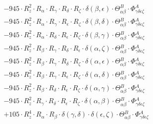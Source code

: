\documentclass{article}
\begin{document}
\begin{equation}
\begin{array}{c}
 \\[0.2em] 		 - 945 \cdot R_{z}^{2} \cdot R_{\alpha{}} \cdot R_{\gamma{}} \cdot R_{\delta{}} \cdot R_{\zeta{}} \cdot \delta{}\left(\beta{}, \epsilon{}\right) \cdot \Theta{}^{B}_{\alpha{}\beta{}} \cdot \Phi{}^{A}_{\gamma{}\delta{}\epsilon{}\zeta{}} 
 \\[0.2em] 		 - 945 \cdot R_{z}^{2} \cdot R_{\alpha{}} \cdot R_{\gamma{}} \cdot R_{\epsilon{}} \cdot R_{\zeta{}} \cdot \delta{}\left(\beta{}, \delta{}\right) \cdot \Theta{}^{B}_{\alpha{}\beta{}} \cdot \Phi{}^{A}_{\gamma{}\delta{}\epsilon{}\zeta{}} 
 \\[0.2em] 		 - 945 \cdot R_{z}^{2} \cdot R_{\alpha{}} \cdot R_{\delta{}} \cdot R_{\epsilon{}} \cdot R_{\zeta{}} \cdot \delta{}\left(\beta{}, \gamma{}\right) \cdot \Theta{}^{B}_{\alpha{}\beta{}} \cdot \Phi{}^{A}_{\gamma{}\delta{}\epsilon{}\zeta{}} 
 \\[0.2em] 		 - 945 \cdot R_{z}^{2} \cdot R_{\beta{}} \cdot R_{\gamma{}} \cdot R_{\delta{}} \cdot R_{\epsilon{}} \cdot \delta{}\left(\alpha{}, \zeta{}\right) \cdot \Theta{}^{B}_{\alpha{}\beta{}} \cdot \Phi{}^{A}_{\gamma{}\delta{}\epsilon{}\zeta{}} 
 \\[0.2em] 		 - 945 \cdot R_{z}^{2} \cdot R_{\beta{}} \cdot R_{\gamma{}} \cdot R_{\delta{}} \cdot R_{\zeta{}} \cdot \delta{}\left(\alpha{}, \epsilon{}\right) \cdot \Theta{}^{B}_{\alpha{}\beta{}} \cdot \Phi{}^{A}_{\gamma{}\delta{}\epsilon{}\zeta{}} 
 \\[0.2em] 		 - 945 \cdot R_{z}^{2} \cdot R_{\beta{}} \cdot R_{\gamma{}} \cdot R_{\epsilon{}} \cdot R_{\zeta{}} \cdot \delta{}\left(\alpha{}, \delta{}\right) \cdot \Theta{}^{B}_{\alpha{}\beta{}} \cdot \Phi{}^{A}_{\gamma{}\delta{}\epsilon{}\zeta{}} 
 \\[0.2em] 		 - 945 \cdot R_{z}^{2} \cdot R_{\beta{}} \cdot R_{\delta{}} \cdot R_{\epsilon{}} \cdot R_{\zeta{}} \cdot \delta{}\left(\alpha{}, \gamma{}\right) \cdot \Theta{}^{B}_{\alpha{}\beta{}} \cdot \Phi{}^{A}_{\gamma{}\delta{}\epsilon{}\zeta{}} 
 \\[0.2em] 		 - 945 \cdot R_{z}^{2} \cdot R_{\gamma{}} \cdot R_{\delta{}} \cdot R_{\epsilon{}} \cdot R_{\zeta{}} \cdot \delta{}\left(\alpha{}, \beta{}\right) \cdot \Theta{}^{B}_{\alpha{}\beta{}} \cdot \Phi{}^{A}_{\gamma{}\delta{}\epsilon{}\zeta{}} 
 \\[0.2em] 		 + 105 \cdot R_{z}^{4} \cdot R_{\alpha{}} \cdot R_{\beta{}} \cdot \delta{}\left(\gamma{}, \delta{}\right) \cdot \delta{}\left(\epsilon{}, \zeta{}\right) \cdot \Theta{}^{B}_{\alpha{}\beta{}} \cdot \Phi{}^{A}_{\gamma{}\delta{}\epsilon{}\zeta{}} 

\end{array}
\end{equation}
\end{document}
